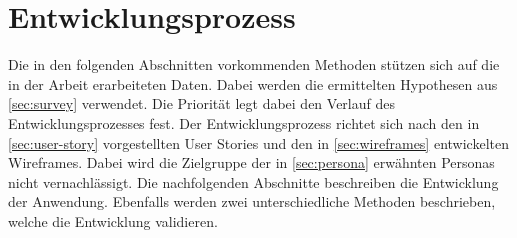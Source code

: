 \section{Entwicklungsprozess}\label{sec:entwicklungsprozess}
Die in den folgenden Abschnitten vorkommenden Methoden stützen sich auf die in der Arbeit erarbeiteten Daten. Dabei werden die ermittelten Hypothesen aus \autoref{sec:survey} verwendet. Die Priorität legt dabei den Verlauf des Entwicklungsprozesses fest. Der Entwicklungsprozess richtet sich nach den in \autoref{sec:user-story} vorgestellten User Stories und den in \autoref{sec:wireframes} entwickelten Wireframes. Dabei wird die Zielgruppe der in \autoref{sec:persona} erwähnten Personas nicht vernachlässigt. Die nachfolgenden Abschnitte beschreiben die Entwicklung der Anwendung. Ebenfalls werden zwei unterschiedliche Methoden beschrieben, welche die Entwicklung validieren.
